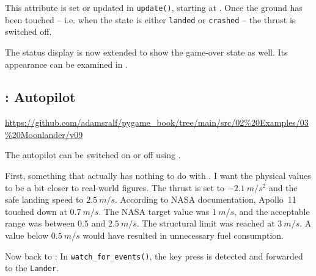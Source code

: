 
This attribute is set or updated in \texttt{update()}, starting at . Once the ground has been touched -- i.e. when the state is either \texttt{landed} or \texttt{crashed} -- the thrust is switched off.


The status display is now extended to show the game-over state as well. Its appearance can be examined in .




\newpage
\subsection{: Autopilot}
\begin{diskbox}
	\url{https://github.com/adamsralf/pygame_book/tree/main/src/02%20Examples/03%20Moonlander/v09}
\end{diskbox}

	The autopilot can be switched on or off using .
\er

First, something that actually has nothing to do with . I want the physical values to be a bit closer to real-world figures. The thrust is set to $\SI{-2.1}{m/s^2}$ and the safe landing speed to $\SI{2.5}{m/s}$. According to NASA documentation, Apollo~11 touched down at $\SI{0.7}{m/s}$. The NASA target value was $\SI{1}{m/s}$, and the acceptable range was between $0.5$ and $\SI{2.5}{m/s}$. The structural limit was reached at $\SI{3}{m/s}$. A value below $\SI{0.5}{m/s}$ would have resulted in unnecessary fuel consumption.


Now back to : In \texttt{watch\_for\_events()}, the key press  is detected and forwarded to the \texttt{Lander}.

